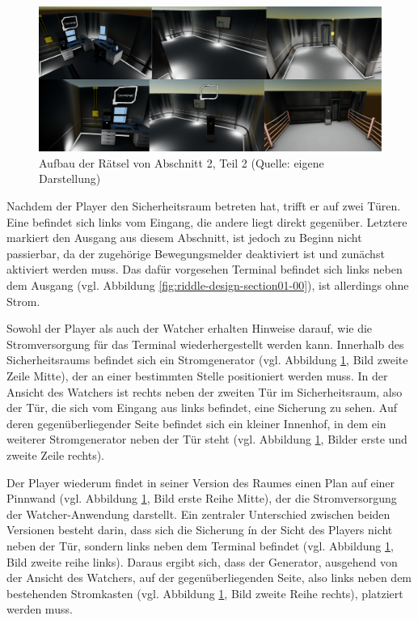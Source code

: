 \begin{figure}[ht]
\centering
\includegraphics[width=1\linewidth]{content/pictures/Rätseldesign - Abschnitt01 - Rätsel01.png}
\caption{Aufbau der Rätsel von Abschnitt 2, Teil 2 (Quelle: eigene Darstellung)}
\label{fig:riddle-design-section01-01}
\end{figure}

Nachdem der Player den Sicherheitsraum betreten hat, trifft er auf zwei Türen. Eine befindet sich links vom Eingang, die andere liegt direkt gegenüber. Letztere markiert den Ausgang aus diesem Abschnitt, ist jedoch zu Beginn nicht passierbar, da der zugehörige Bewegungsmelder deaktiviert ist und zunächst aktiviert werden muss. Das dafür vorgesehen Terminal befindet sich links neben dem Ausgang (vgl. Abbildung \ref{fig:riddle-design-section01-00}), ist allerdings ohne Strom.

Sowohl der Player als auch der Watcher erhalten Hinweise darauf, wie die Stromversorgung für das Terminal wiederhergestellt werden kann. Innerhalb des Sicherheitsraums befindet sich ein Stromgenerator (vgl. Abbildung \ref{fig:riddle-design-section01-01}, Bild zweite Zeile Mitte), der an einer bestimmten Stelle positioniert werden muss. In der Ansicht des Watchers ist rechts neben der zweiten Tür im Sicherheitsraum, also der Tür, die sich vom Eingang aus links befindet, eine Sicherung zu sehen. Auf deren gegenüberliegender Seite befindet sich ein kleiner Innenhof, in dem ein weiterer Stromgenerator neben der Tür steht (vgl. Abbildung \ref{fig:riddle-design-section01-01}, Bilder erste und zweite Zeile rechts).

Der Player wiederum findet in seiner Version des Raumes einen Plan auf einer Pinnwand (vgl. Abbildung \ref{fig:riddle-design-section01-01}, Bild erste Reihe Mitte), der die Stromversorgung der Watcher-Anwendung darstellt. Ein zentraler Unterschied zwischen beiden Versionen besteht darin, dass sich die Sicherung ín der Sicht des Players nicht neben der Tür, sondern links neben dem Terminal befindet (vgl. Abbildung \ref{fig:riddle-design-section01-01}, Bild zweite reihe links). Daraus ergibt sich, dass der Generator, ausgehend von der Ansicht des Watchers, auf der gegenüberliegenden Seite, also links neben dem bestehenden Stromkasten (vgl. Abbildung \ref{fig:riddle-design-section01-01}, Bild zweite Reihe rechts), platziert werden muss.

